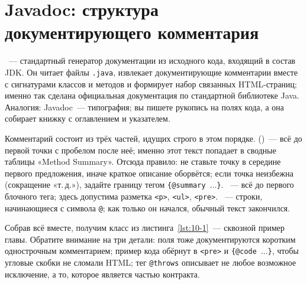 \section{Javadoc: структура документирующего комментария}

~--- стандартный генератор документации из исходного кода, входящий в состав JDK. Он читает файлы \texttt{.java}, извлекает документирующие комментарии вместе с сигнатурами классов и методов и формирует набор связанных HTML-страниц; именно так сделана официальная документация по стандартной библиотеке Java. Аналогия: Javadoc~--- типография; вы пишете рукопись на полях кода, а она собирает книжку с оглавлением и указателем.

Комментарий состоит из трёх частей, идущих строго в этом порядке.  ()~--- всё до первой точки с пробелом после неё; именно этот текст попадает в сводные таблицы «Method Summary». Отсюда правило: не ставьте точку в середине первого предложения, иначе краткое описание оборвётся; если точка неизбежна (сокращение «т.\,д.»), задайте границу тегом \texttt{\{@summary $\ldots$\}}. ~--- всё до первого блочного тега; здесь допустима разметка \texttt{<p>}, \texttt{<ul>}, \texttt{<pre>}. ~--- строки, начинающиеся с символа \texttt{@}; как только он начался, обычный текст закончился.

Собрав всё вместе, получим класс из листинга~\ref{lst:10-1}~--- сквозной пример главы. Обратите внимание на три детали: поля тоже документируются коротким однострочным комментарием; пример кода обёрнут в \texttt{<pre>} и \texttt{\{@code $\ldots$\}}, чтобы угловые скобки не сломали HTML; тег \texttt{@throws} описывает не любое возможное исключение, а то, которое является частью контракта.

